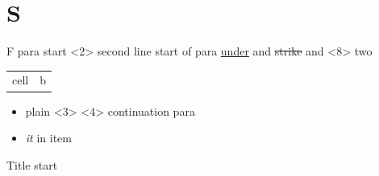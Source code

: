 \documentclass[presentation]{beamer}
\author{root}
\date{\today}
\title{}
\begin{document}
\section{S}
\label{sec:orgff2b67c}
\begin{frame}[label={sec:orgc0f4678}]{F}
 para start
<2> second line start of para
\uline{ under} and \sout{ strike} and \alert<7>{<8> two}
\begin{center}
\begin{tabular}{ll}
 cell & b\\[0pt]
\end{tabular}
\end{center}

\begin{itemize}
\item plain <3>
<4> continuation para
\item \emph{ it} in item
\end{itemize}
\end{frame}
\begin{frame}[label={sec:org96cb473}]{ Title start}
\end{frame}
\end{document}
